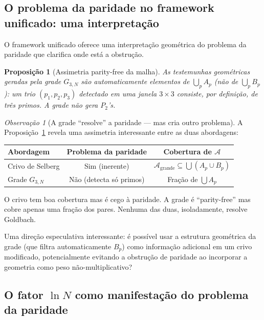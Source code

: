 \documentclass[12pt,a4paper]{article}
\newtheorem{proposition}[theorem]{Proposi\c{c}\~ao}
\theoremstyle{remark}
\newtheorem{remark}[theorem]{Observa\c{c}\~ao}
\newcommand{\calA}{\mathcal{A}}
\begin{document}
	\subsection{O problema da paridade no framework unificado: uma interpreta\c{c}\~ao}
	
	O framework unificado oferece uma interpreta\c{c}\~ao geom\'etrica do problema
	da paridade que clarifica onde est\'a a obstru\c{c}\~ao.
	
	\begin{proposition}[Assimetria parity-free da malha]
		\label{prop:parity-free}
		As testemunhas geom\'etricas geradas pela grade $G_{3,N}$ s\~ao automaticamente
		elementos de $\bigcup_p A_p$ (n\~ao de $\bigcup_p B_p$): um trio $(p_1,p_2,p_3)$
		detectado em uma janela $3\times3$ consiste, por defini\c{c}\~ao, de tr\^es primos.
		A grade n\~ao gera $P_2$'s.
	\end{proposition}
	
	\begin{remark}[A grade ``resolve'' a paridade --- mas cria outro problema]
		A Proposi\c{c}\~ao~\ref{prop:parity-free} revela uma assimetria interessante entre
		as duas abordagens:
		
		\medskip
		\begin{center}
			\begin{tabular}{lcc}
				\hline
				Abordagem & Problema da paridade & Cobertura de $\calA$ \\
				\hline
				Crivo de Selberg & Sim (inerente) & $\calA_{\text{grande}} \subseteq \bigcup(A_p\cup B_p)$ \\
				Grade $G_{3,N}$  & N\~ao (detecta s\'o primos) & Fra\c{c}\~ao de $\bigcup A_p$ \\
				\hline
			\end{tabular}
		\end{center}
		\medskip
		
		O crivo tem boa cobertura mas \'e cego \`a paridade.
		A grade \'e ``parity-free'' mas cobre apenas uma fra\c{c}\~ao dos pares.
		Nenhuma das duas, isoladamente, resolve Goldbach.
		
		Uma dire\c{c}\~ao especulativa interessante: \'e poss\'ivel usar a estrutura
		geom\'etrica da grade (que filtra automaticamente $B_p$) como informa\c{c}\~ao
		adicional em um crivo modificado, potencialmente evitando a obstru\c{c}\~ao de paridade
		ao incorporar a geometria como peso n\~ao-multiplicativo?
	\end{remark}
	
	\subsection{O fator $\ln N$ como manifesta\c{c}\~ao do problema da paridade}
	
\end{document}
